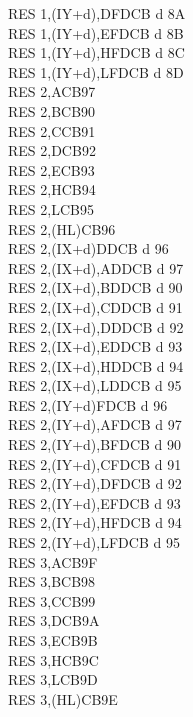 \begin{multicols}{3}
{\begin{tabbing}
        RES 1,(IY+d),D\UNDOC\>FDCB d 8A\\
        RES 1,(IY+d),E\UNDOC\>FDCB d 8B\\
        RES 1,(IY+d),H\UNDOC\>FDCB d 8C\\
        RES 1,(IY+d),L\UNDOC\>FDCB d 8D\\
        RES 2,A\>CB97\\
        RES 2,B\>CB90\\
        RES 2,C\>CB91\\
        RES 2,D\>CB92\\
        RES 2,E\>CB93\\
        RES 2,H\>CB94\\
        RES 2,L\>CB95\\
        RES 2,(HL)\>CB96\\
        RES 2,(IX+d)\>DDCB d 96\\
        RES 2,(IX+d),A\UNDOC\>DDCB d 97\\
        RES 2,(IX+d),B\UNDOC\>DDCB d 90\\
        RES 2,(IX+d),C\UNDOC\>DDCB d 91\\
        RES 2,(IX+d),D\UNDOC\>DDCB d 92\\
        RES 2,(IX+d),E\UNDOC\>DDCB d 93\\
        RES 2,(IX+d),H\UNDOC\>DDCB d 94\\
        RES 2,(IX+d),L\UNDOC\>DDCB d 95\\
        RES 2,(IY+d)\>FDCB d 96\\
        RES 2,(IY+d),A\UNDOC\>FDCB d 97\\
        RES 2,(IY+d),B\UNDOC\>FDCB d 90\\
        RES 2,(IY+d),C\UNDOC\>FDCB d 91\\
        RES 2,(IY+d),D\UNDOC\>FDCB d 92\\
        RES 2,(IY+d),E\UNDOC\>FDCB d 93\\
        RES 2,(IY+d),H\UNDOC\>FDCB d 94\\
        RES 2,(IY+d),L\UNDOC\>FDCB d 95\\
        RES 3,A\>CB9F\\
        RES 3,B\>CB98\\
        RES 3,C\>CB99\\
        RES 3,D\>CB9A\\
        RES 3,E\>CB9B\\
        RES 3,H\>CB9C\\
        RES 3,L\>CB9D\\
        RES 3,(HL)\>CB9E\\

\end{tabbing}}
\end{multicols}
